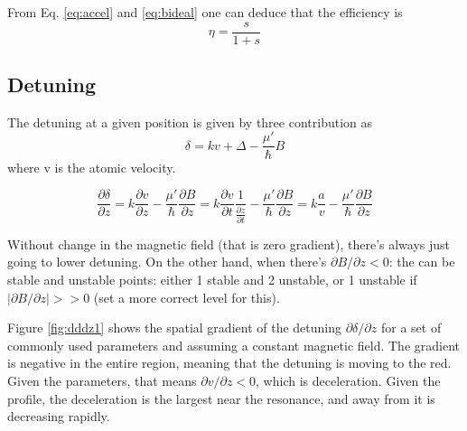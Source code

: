 \documentclass[12pt,a4paper]{article}
\begin{document}
From Eq. \ref{eq:accel} and \ref{eq:bideal} one can deduce that the efficiency is
\begin{equation}
\eta = \frac{s}{1 + s}
\end{equation}

\subsection{Detuning}

The detuning at a given position is given by three contribution as
\begin{equation}
\delta = k v + \Delta - \frac{\mu'}{\hbar} B
\end{equation}
where v is the atomic velocity.

\begin{equation}
\frac{\partial \delta}{\partial z} = k \frac{\partial v}{\partial z} - \frac{\mu'}{\hbar}\frac{\partial B}{\partial z} = k \frac{\partial v}{\partial t} \frac{1} {\frac{\partial z}{\partial t}} - \frac{\mu'}{\hbar}\frac{\partial B}{\partial z}
= k \frac {a}{v} - \frac{\mu'}{\hbar}\frac{\partial B}{\partial z}
\end{equation}

Without change in the magnetic field (that is zero gradient), there's always just going to lower detuning. On the other hand, when there's $\partial B/\partial z < 0$: the can be stable and unstable points: either 1 stable and 2 unstable, or 1 unstable if $|\partial B / \partial z| >> 0$ (set a more correct level for this).


Figure \ref{fig:dddz1} shows the spatial gradient of the detuning $\partial \delta / \partial z$ for a set of commonly used parameters and assuming a constant magnetic field. The gradient is negative in the entire region, meaning that the detuning is moving to the red. Given the parameters, that means $\partial v / \partial z < 0$, which is deceleration. Given the profile, the deceleration is the largest near the resonance, and away from it is decreasing rapidly.
\end{document}
